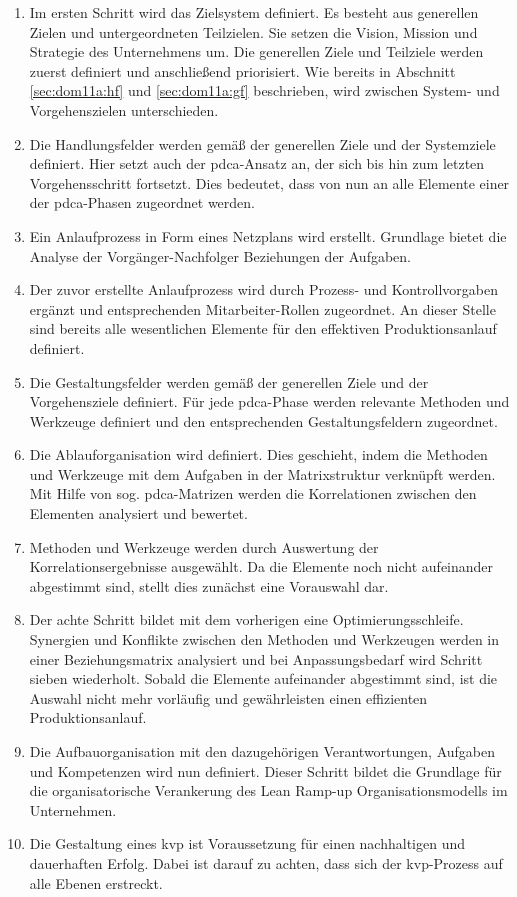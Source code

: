 \begin{enumerate}
 \item Im ersten Schritt wird das Zielsystem definiert. Es besteht aus generellen Zielen und untergeordneten Teilzielen. Sie setzen die Vision, Mission und Strategie des Unternehmens um. Die generellen Ziele und Teilziele werden zuerst definiert und anschließend priorisiert. Wie bereits in Abschnitt \ref{sec:dom11a:hf} und \ref{sec:dom11a:gf} beschrieben, wird zwischen System- und Vorgehenszielen unterschieden. 
 \item Die Handlungsfelder werden gemäß der generellen Ziele und der Systemziele definiert. Hier setzt auch der \gls{pdca}-Ansatz an, der sich bis hin zum letzten Vorgehensschritt fortsetzt. Dies bedeutet, dass von nun an alle Elemente einer der \gls{pdca}-Phasen zugeordnet werden. 
 \item Ein Anlaufprozess in Form eines Netzplans wird erstellt. Grundlage bietet die Analyse der Vorgänger-Nachfolger Beziehungen der Aufgaben.
 \item  Der zuvor erstellte Anlaufprozess wird durch Prozess- und Kontrollvorgaben ergänzt und entsprechenden Mitarbeiter-Rollen zugeordnet. 
 An dieser Stelle sind bereits alle wesentlichen Elemente für den effektiven Produktionsanlauf definiert. 
 \item Die Gestaltungsfelder werden gemäß der generellen Ziele und der Vorgehensziele definiert. Für jede \gls{pdca}-Phase werden relevante Methoden und Werkzeuge definiert und den entsprechenden Gestaltungsfeldern zugeordnet. 
 \item Die Ablauforganisation wird definiert. Dies geschieht, indem die Methoden und Werkzeuge mit dem Aufgaben in der Matrixstruktur verknüpft werden. Mit Hilfe von sog. \gls{pdca}-Matrizen werden die Korrelationen zwischen den Elementen analysiert und bewertet. 
 \item Methoden und Werkzeuge werden durch Auswertung der Korrelationsergebnisse ausgewählt. Da die Elemente noch nicht aufeinander abgestimmt sind, stellt dies zunächst eine Vorauswahl dar. 
 \item Der achte Schritt bildet mit dem vorherigen eine Optimierungsschleife. Synergien und Konflikte zwischen den Methoden und Werkzeugen werden in einer Beziehungsmatrix analysiert und bei Anpassungsbedarf wird Schritt sieben wiederholt. Sobald die Elemente aufeinander abgestimmt sind, ist die Auswahl nicht mehr vorläufig und gewährleisten einen effizienten Produktionsanlauf. 
 \item Die Aufbauorganisation mit den dazugehörigen Verantwortungen, Aufgaben und Kompetenzen %
 wird nun definiert. Dieser Schritt bildet die Grundlage für die organisatorische Verankerung des Lean Ramp-up Organisationsmodells im Unternehmen. 
 \item Die Gestaltung eines \gls{kvp} ist Voraussetzung für einen nachhaltigen und dauerhaften Erfolg. Dabei ist darauf zu achten, dass sich der \gls{kvp}-Prozess auf alle Ebenen erstreckt. 
\end{enumerate}

